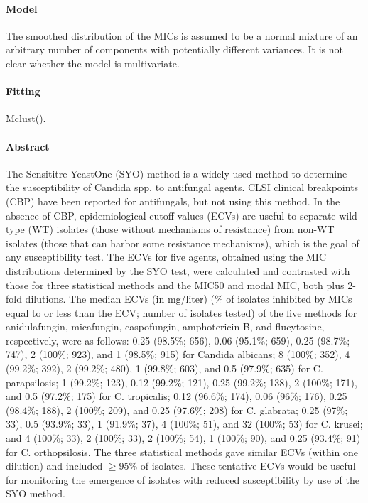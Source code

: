 \documentclass[a4paper]{article}
\begin{document}
\paragraph{Model} The smoothed distribution of the MICs is assumed to be a normal mixture of an arbitrary number of components with potentially different variances. It is not clear whether the model is multivariate.
\paragraph{Fitting} Mclust().
\paragraph{Abstract} The Sensititre YeastOne (SYO) method is a widely used method to determine the susceptibility of Candida spp. to antifungal agents. CLSI clinical breakpoints (CBP) have been reported for antifungals, but not using this method. In the absence of CBP, epidemiological cutoff values (ECVs) are useful to separate wild-type (WT) isolates (those without mechanisms of resistance) from non-WT isolates (those that can harbor some resistance mechanisms), which is the goal of any susceptibility test. The ECVs for five agents, obtained using the MIC distributions determined by the SYO test, were calculated and contrasted with those for three statistical methods and the MIC50 and modal MIC, both plus 2-fold dilutions. The median ECVs (in mg/liter) (\% of isolates inhibited by MICs equal to or less than the ECV; number of isolates tested) of the five methods for anidulafungin, micafungin, caspofungin, amphotericin B, and flucytosine, respectively, were as follows: 0.25 (98.5\%; 656), 0.06 (95.1\%; 659), 0.25 (98.7\%; 747), 2 (100\%; 923), and 1 (98.5\%; 915) for Candida albicans; 8 (100\%; 352), 4 (99.2\%; 392), 2 (99.2\%; 480), 1 (99.8\%; 603), and 0.5 (97.9\%; 635) for C. parapsilosis; 1 (99.2\%; 123), 0.12 (99.2\%; 121), 0.25 (99.2\%; 138), 2 (100\%; 171), and 0.5 (97.2\%; 175) for C. tropicalis; 0.12 (96.6\%; 174), 0.06 (96\%; 176), 0.25 (98.4\%; 188), 2 (100\%; 209), and 0.25 (97.6\%; 208) for C. glabrata; 0.25 (97\%; 33), 0.5 (93.9\%; 33), 1 (91.9\%; 37), 4 (100\%; 51), and 32 (100\%; 53) for C. krusei; and 4 (100\%; 33), 2 (100\%; 33), 2 (100\%; 54), 1 (100\%; 90), and 0.25 (93.4\%; 91) for C. orthopsilosis. The three statistical methods gave similar ECVs (within one dilution) and included $\geq$95\% of isolates. These tentative ECVs would be useful for monitoring the emergence of isolates with reduced susceptibility by use of the SYO method.
\end{document}
